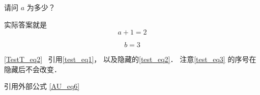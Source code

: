 \begin{example}{}
请问 $a$ 为多少？
\pay

实际答案就是
\begin{equation}\label{test_eq2}
a + 1 = 2
\end{equation}
\paid
\end{example}

\begin{equation}\label{test_eq3}
b = 3
\end{equation}

\autoref{TestT_eq2}~
引用\autoref{test_eq1}， 以及隐藏的\autoref{test_eq2}． 注意\autoref{test_eq3} 的序号在隐藏后不会改变．

引用外部公式 \autoref{AU_eq6}~
